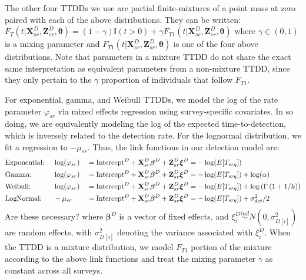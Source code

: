 \documentclass[useAMS,usenatbib,referee,12pt]{article}
\newcommand{\jarad}[1]{{\color{red} #1}}
\begin{document}
The other four TTDDs we use are partial finite-mixtures of a point mass at zero paired with each of the above distributions.  They can be written: $F_T(t|\textbf{X}_{sr}^D, \textbf{Z}_{sr}^D, \boldsymbol{\theta}) = (1-\gamma)\mathbb{I}(t>0) + \gamma F_{T1}(t|\textbf{X}_{sr}^D, \textbf{Z}_{sr}^D, \boldsymbol{\theta})$ where $\gamma \in (0,1)$ is a mixing parameter and $F_{T1}(t|\textbf{X}_{sr}^D, \textbf{Z}_{sr}^D, \boldsymbol{\theta})$ is one of the four above distributions.  Note that parameters in a mixture TTDD do not share the exact same interpretation as equivalent parameters from a non-mixture TTDD, since they only pertain to the $\gamma$ proportion of individuals that follow $F_{T1}$.

For exponential, gamma, and Weibull TTDDs, we model the log of the rate parameter $\varphi_{sr}$ via mixed effects regression using survey-specific covariates.  In so doing, we are equivalently modeling the log of the expected time-to-detection, which is inversely related to the detection rate.  For the lognormal distribution, we fit a regression to $-\mu_{sr}$.  Thus, the link functions in our detection model are:
\begin{alignat}{3}
&\text{Exponential:\;} &&\log(\varphi_{sr}) &&= \text{Intercept}^D + \textbf{X}_{sr}^D\boldsymbol{\beta}^D + \textbf{Z}_{sr}^D\boldsymbol{\xi}^D = -\log(E[T_{srq}])\\
&\text{Gamma:} &&\log(\varphi_{sr}) &&= \text{Intercept}^D + \textbf{X}_{sr}^D\boldsymbol{\beta}^D + \textbf{Z}_{sr}^D\boldsymbol{\xi}^D = -\log(E[T_{srq}]) + \log(\alpha)\\
&\text{Weibull:}  &&\log(\varphi_{sr}) &&= \text{Intercept}^D + \textbf{X}_{sr}^D\boldsymbol{\beta}^D + \textbf{Z}_{sr}^D\boldsymbol{\xi}^D = -\log(E[T_{srq}]) + \log\left(\Gamma\left(1 + 1/k\right)\right)\\
&\text{LogNormal:} &&-\mu_{sr} &&= \text{Intercept}^D + \textbf{X}_{sr}^D\boldsymbol{\beta}^D + \textbf{Z}_{sr}^D\boldsymbol{\xi}^D = -\log(E[T_{srq}]) + \sigma_{det}^2/2
\end{alignat}
\jarad{Are these necessary?}
where $\boldsymbol{\beta}^D$ is a vector of fixed effects, and $\xi_i^D \overset{ind}{\sim} N(0,\sigma_{D[i]}^2)$ are random effects, with $\sigma_{D[i]}^2$ denoting the variance associated with $\xi_i^D$.  When the TTDD is a mixture distribution, we model $F_{T1}$ portion of the mixture according to the above link functions and treat the mixing parameter $\gamma$ as constant across all surveys.
\end{document}
